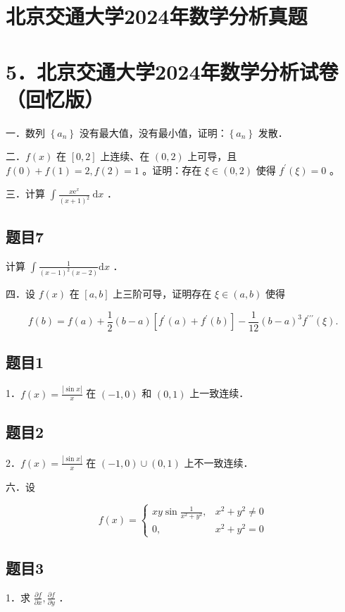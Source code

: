 \documentclass{article}
\begin{document}
\section*{北京交通大学2024年数学分析真题}
\section*{5．北京交通大学2024年数学分析试卷（回忆版）}
一．数列 \(\left\{a_{n}\right\}\) 没有最大值，没有最小值，证明：\(\left\{a_{n}\right\}\) 发散．

二．\(f(x)\) 在 \([0,2]\) 上连续、在 \((0,2)\) 上可导，且 \(f(0)+f(1)=2, f(2)=1\) 。证明：存在 \(\xi \in(0,2)\) 使得 \(f^{\prime}(\xi)=0\) 。

三．计算 \(\int \frac{x \mathrm{e}^{x}}{(x+1)^{2}} \mathrm{~d} x\) ．

\subsection{题目7}
计算 \(\int \frac{1}{(x-1)^{2}(x-2)} \mathrm{d} x\) ．

四．设 \(f(x)\) 在 \([a, b]\) 上三阶可导，证明存在 \(\xi \in(a, b)\) 使得

\[
f(b)=f(a)+\frac{1}{2}(b-a)\left[f^{\prime}(a)+f^{\prime}(b)\right]-\frac{1}{12}(b-a)^{3} f^{\prime \prime \prime}(\xi) .
\]

\subsection{题目1}
1．\(f(x)=\frac{|\sin x|}{x}\) 在 \((-1,0)\) 和 \((0,1)\) 上一致连续．

\subsection{题目2}
2．\(f(x)=\frac{|\sin x|}{x}\) 在 \((-1,0) \cup(0,1)\) 上不一致连续．

六．设

\[
f(x)= \begin{cases}x y \sin \frac{1}{x^{2}+y^{2}}, & x^{2}+y^{2} \neq 0 \\ 0, & x^{2}+y^{2}=0\end{cases}
\]

\subsection{题目3}
1．求 \(\frac{\partial f}{\partial x}, \frac{\partial f}{\partial y}\) ．\\
\end{document}

